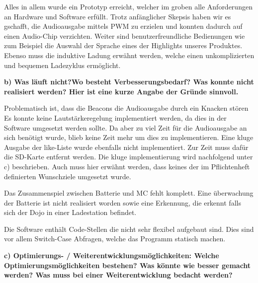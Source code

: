 Alles in allem wurde ein Prototyp erreicht, welcher im groben alle Anforderungen an Hardware und Software erfüllt. Trotz anfänglicher Skepsis haben wir es gschafft, die Audioausgabe mittels PWM zu erzielen und konnten dadurch auf einen Audio-Chip verzichten. Weiter sind benutzerfreundliche Bedienungen wie zum Beispiel die Auswahl der Sprache eines der Highlights unseres Produktes. Ebenso muss die induktive Ladung erwähnt werden, welche einen unkomplizierten und bequemen Ladezyklus ermöglicht.

\textbf{b) Was läuft nicht?Wo besteht Verbesserungsbedarf? Was konnte nicht realisiert werden? Hier ist eine kurze Angabe der Gründe sinnvoll.}

 Problematisch ist, dass die Beacons die Audioausgabe durch ein Knacken stören\\

Es konnte keine Lautstärkeregelung implementiert werden, da dies in der Software umgesetzt werden sollte. Da aber zu viel Zeit für die Audioausgabe an sich benötigt wurde, blieb keine Zeit mehr um dies zu implementieren. Eine kluge Ausgabe der like-Liste wurde ebenfalls nicht implementiert. Zur Zeit muss dafür die SD-Karte entfernt werden. Die kluge implementierung wird nachfolgend unter c) beschrieben.  Auch muss hier erwähnt werden, dass keines der im Pflichtenheft definierten Wunschziele umgesetzt wurde.

Das Zusammenspiel zwischen Batterie und MC fehlt komplett. Eine überwachung der Batterie ist nicht realisiert worden sowie eine Erkennung, die erkennt falls sich der Dojo in einer Ladestation befindet.

Die Software enthält Code-Stellen die nicht sehr flexibel aufgebaut sind. Dies sind vor allem Switch-Case Abfragen, welche das Programm statisch machen.
 
\textbf{c) Optimierungs- / Weiterentwicklungsmöglichkeiten: Welche Optimierungsmöglichkeiten bestehen? Was könnte wie besser gemacht werden? Was muss bei einer Weiterentwicklung bedacht werden?}

